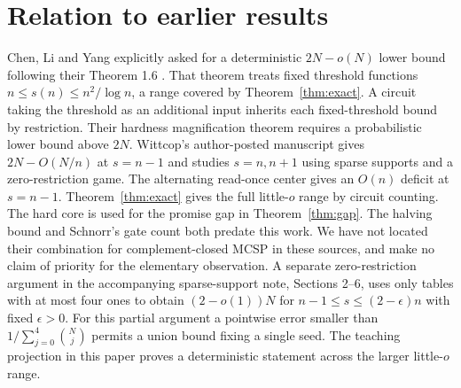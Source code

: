 \documentclass[11pt]{article}
\begin{document}
\section{Relation to earlier results}
Chen, Li and Yang explicitly asked for a deterministic $2N-o(N)$ lower bound following their Theorem 1.6 \cite[p.~23:7]{cly}. That theorem treats fixed threshold functions $n\le s(n)\le n^2/\log n$, a range covered by Theorem~\ref{thm:exact}. A circuit taking the threshold as an additional input inherits each fixed-threshold bound by restriction. Their hardness magnification theorem requires a probabilistic lower bound above $2N$. Wittcop's author-posted manuscript \cite{wittcop} gives $2N-O(N/n)$ at $s=n-1$ and studies $s=n,n+1$ using sparse supports and a zero-restriction game. The alternating read-once center gives an $O(n)$ deficit at $s=n-1$. Theorem~\ref{thm:exact} gives the full little-$o$ range by circuit counting. The hard core is used for the promise gap in Theorem~\ref{thm:gap}. The halving bound and Schnorr's gate count both predate this work. We have not located their combination for complement-closed MCSP in these sources, and make no claim of priority for the elementary observation.
A separate zero-restriction argument in the accompanying sparse-support note, Sections 2--6, uses only tables with at most four ones to obtain $(2-o(1))N$ for $n-1\le s\le(2-\epsilon)n$ with fixed $\epsilon>0$. For this partial argument a pointwise error smaller than $1/\sum_{j=0}^4\binom Nj$ permits a union bound fixing a single seed. The teaching projection in this paper proves a deterministic statement across the larger little-$o$ range.
\end{document}
